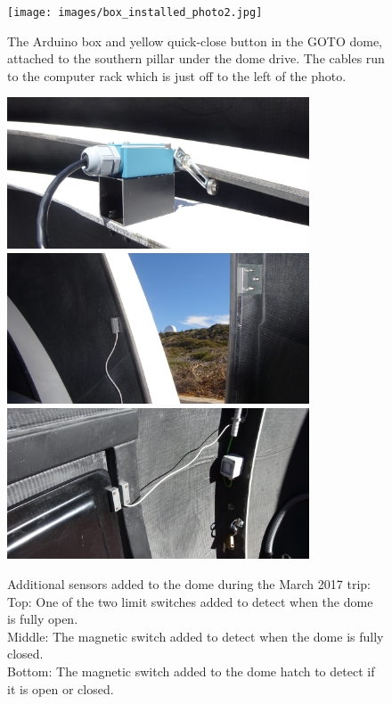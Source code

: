\begin{colsection}
\begin{colsection}
\begin{figure}[p]
    \begin{center}
        \texttt{[image: images/box\_installed\_photo2.jpg]}
    \end{center}
    \caption[The Arduino box and quick-close button in the GOTO dome]{
        The Arduino box and yellow quick-close button in the GOTO dome, attached to the southern pillar under the dome drive. The cables run to the computer rack which is just off to the left of the photo.
    }\label{fig:arduino_button_dome}
\end{figure}

\newpage

\begin{figure}[p]
    \begin{center}
        \includegraphics[width=0.8\textwidth]{images/dome_sensor_1.jpg}
        \includegraphics[width=0.8\textwidth]{images/dome_sensor_2.jpg}
        \includegraphics[width=0.8\textwidth]{images/dome_sensor_3.jpg}
    \end{center}
    \caption[Additional sensors added to the dome]{
        Additional sensors added to the dome during the March 2017 trip:\\
        Top: One of the two limit switches added to detect when the dome is fully open.\\
        Middle: The magnetic switch added to detect when the dome is fully closed.\\
        Bottom: The magnetic switch added to the dome hatch to detect if it is open or closed.
    }\label{fig:dome_switches}
\end{figure}


\end{colsection}
\end{colsection}
